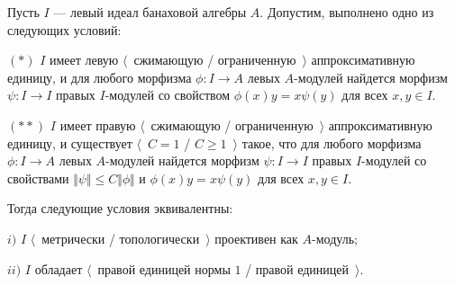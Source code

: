 \begin{lemma}\label{GoodIdealMetTopProjIsUnital} Пусть $I$ --- левый идеал банаховой алгебры $A$. Допустим, выполнено одно из следующих условий:

$(*)$ $I$ имеет левую $\langle$~сжимающую / ограниченную~$\rangle$ аппроксимативную единицу, и для любого морфизма $\phi:I\to A$ левых $A$-модулей найдется морфизм $\psi:I\to I$ правых $I$-модулей со свойством $\phi(x)y=x\psi(y)$ для всех $x,y\in I$.

$(**)$ $I$ имеет правую $\langle$~сжимающую / ограниченную~$\rangle$ аппроксимативную единицу, и существует $\langle$~$C=1$ / $C\geq 1$~$\rangle$ такое, что для любого морфизма $\phi:I\to A$ левых $A$-модулей найдется морфизм $\psi:I\to I$ правых $I$-модулей со свойствами $\Vert\psi\Vert\leq C\Vert\phi\Vert$ и $\phi(x)y=x\psi(y)$ для всех $x,y\in I$.

Тогда следующие условия эквивалентны:

$i)$ $I$ $\langle$~метрически / топологически~$\rangle$ проективен как $A$-модуль;

$ii)$ $I$ обладает $\langle$~правой единицей нормы $1$ / правой единицей~$\rangle$.
\end{lemma} 
